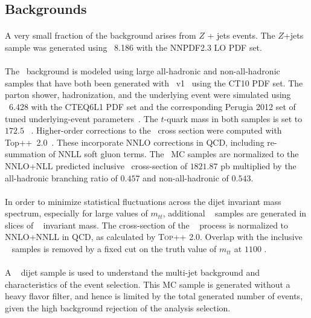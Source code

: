 \subsection{Backgrounds}
\label{sec:MC-bkg}
\paragraph{}
A very small fraction of the background arises from $Z$ + jets events. The $Z$+jets sample was generated using \pythia~8.186 with the NNPDF2.3 LO PDF set.

\paragraph{}
The \ttbar\ background is modeled using large all-hadronic and non-all-hadronic samples that have both been generated with \powhegbox\ v1~\cite{Alioli:2010xd} using the CT10 PDF set. 
The parton shower, hadronization, and the underlying event were simulated using \pythia~6.428 with the CTEQ6L1 PDF set and the corresponding Perugia 2012 set of tuned underlying-event parameters~\cite{Skands:2010ak}.
The $t$-quark mass in both samples is set to $172.5$ \GeV~.
Higher-order corrections to the \ttbar\ cross section were computed with Top++~2.0~\cite{Czakon:20142930}. These incorporate NNLO corrections in QCD, including re-summation of NNLL soft gluon terms.
The \ttbar\ MC samples are normalized to the NNLO+NLL predicted inclusive \ttbar\ cross-section of
$1821.87$ pb multiplied by the all-hadronic branching ratio of $0.457$ and non-all-hadronic of $0.543$.

\paragraph{}
In order to minimize statistical fluctuations across the dijet invariant mass spectrum, especially for large values of $m_{tt}$, additional \ttbar~ samples are generated in slices of \ttbar~ invariant mass. The cross-section of the \ttbar~ process is normalized to NNLO+NNLL in QCD, as calculated by \textsc{Top++} 2.0. Overlap with the inclusive \ttbar~ samples is removed by a fixed cut on the truth value of $m_{tt}$ at $1100$ \GeV.

\paragraph{}
A \pythia~ dijet sample is used to understand the multi-jet background and characteristics of the event selection. 
This MC sample is generated without a heavy flavor filter, and hence is limited by the total generated number of events, given the high background rejection of the analysis selection.











